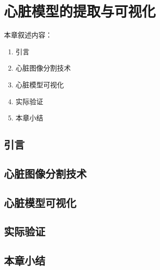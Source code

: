 \chapter{心脏模型的提取与可视化}
\label{chap5}

本章叙述内容：
\begin{enumerate}
  \item 引言
  \item 心脏图像分割技术
  \item 心脏模型可视化
  \item 实际验证
  \item 本章小结
\end{enumerate}

\section{引言}

\section{心脏图像分割技术}

\section{心脏模型可视化}

\section{实际验证}

\section{本章小结}
